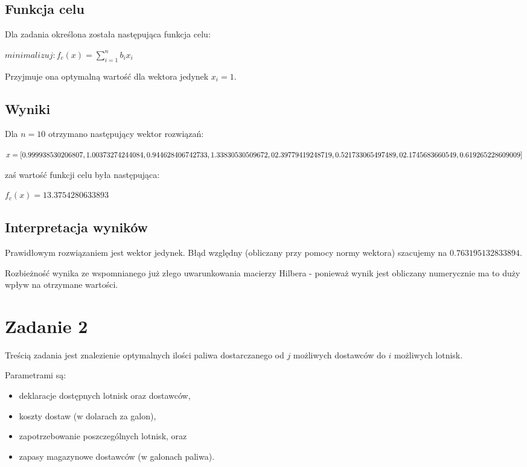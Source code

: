 \documentclass[polish,12pt,titlepage]{article}
\begin{document}
\subsection{Funkcja celu}

Dla zadania określona została następująca funkcja celu:

\begin{center}
$minimalizuj: f_c(x) = \sum\limits_{i=1}^n b_i x_i$
\end{center}

Przyjmuje ona optymalną wartość dla wektora jedynek $x_i = 1$.

\subsection{Wyniki}

Dla $n = 10$ otrzymano następujący wektor rozwiązań:

\begin{center}
$x = [0.999938530206807, 1.00373274244084,  0.944628406742733, 1.33830530509672, \linebreak
     0 2.39779419248719, 0.521733065497489, 0 2.1745683660549, 0.619265228609009]$
\end{center}
     
zaś wartość funkcji celu była następująca:

\begin{center}
$f_c(x) = 13.3754280633893$
\end{center}

\subsection{Interpretacja wyników}

Prawidłowym rozwiązaniem jest wektor jedynek. Błąd względny (obliczany przy pomocy normy wektora) szacujemy na $0.763195132833894$.

Rozbieżność wynika ze wspomnianego już złego uwarunkowania macierzy Hilbera - ponieważ wynik jest obliczany numerycznie ma to duży wpływ na otrzymane wartości.

\section{Zadanie 2}

Treścią zadania jest znalezienie optymalnych ilości paliwa dostarczanego od $j$ możliwych dostawców do $i$ możliwych lotnisk.

Parametrami są:
\begin{itemize}
    \item deklaracje dostępnych lotnisk oraz dostawców,
    \item koszty dostaw (w dolarach za galon),
    \item zapotrzebowanie poszczególnych lotnisk, oraz
    \item zapasy magazynowe dostawców (w galonach paliwa).
\end{itemize}
\end{document}
